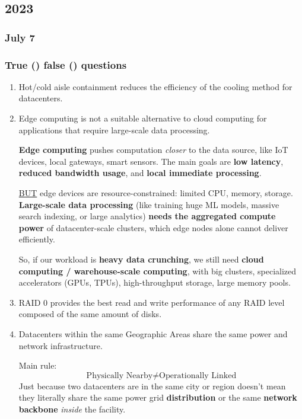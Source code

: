 \subsection{2023}

\subsubsection{July 7}

\subsubsection*{True (\trueIcon) false (\falseIcon) questions}

\begin{enumerate}
    \item \falseIcon \: Hot/cold aisle containment reduces the efficiency of the cooling method for datacenters.
    \item \trueIcon \: Edge computing is not a suitable alternative to cloud computing for applications that require large-scale data processing.
    \begin{deepeningbox}
        \textbf{Edge computing} pushes computation \emph{closer} to the data source, like IoT devices, local gateways, smart sensors. The main goals are \textbf{low latency}, \textbf{reduced bandwidth usage}, and \textbf{local immediate processing}.

        \highspace
        \underline{BUT} edge devices are resource-constrained: limited CPU, memory, storage. \textbf{Large-scale data processing} (like training huge ML models, massive search indexing, or large analytics) \textbf{needs the aggregated compute power} of datacenter-scale clusters, which edge nodes alone cannot deliver efficiently.

        \highspace
        So, if our workload is \textbf{heavy data crunching}, we still need \textbf{cloud computing / warehouse-scale computing}, with big clusters, specialized accelerators (GPUs, TPUs), high-throughput storage, large memory pools.
    \end{deepeningbox}
    \item \trueIcon \: RAID 0 provides the best read and write performance of any RAID level composed of the same amount of disks.
    \item \falseIcon \: Datacenters within the same Geographic Areas share the same power and network infrastructure.
    \begin{deepeningbox}
        Main rule:
        \begin{equation*}
            \text{Physically Nearby} \ne \text{Operationally Linked}
        \end{equation*}
        Just because two datacenters are in the same city or region doesn't mean they literally share the same power grid \textbf{distribution} or the same \textbf{network backbone} \emph{inside} the facility.


\end{deepeningbox}
\end{enumerate}
